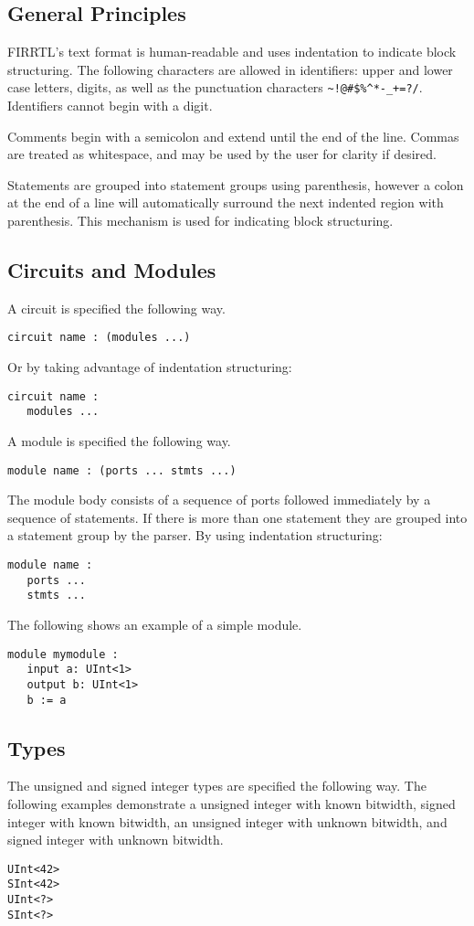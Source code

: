 \documentclass[12pt]{article}
\begin{document}
\subsection*{General Principles}
FIRRTL's text format is human-readable and uses indentation to indicate block structuring.
The following characters are allowed in identifiers: upper and lower case letters, digits, as well as the punctuation characters \verb|~!@#$%^*-_+=?/|.
Identifiers cannot begin with a digit. 

Comments begin with a semicolon and extend until the end of the line.
Commas are treated as whitespace, and may be used by the user for clarity if desired. 

Statements are grouped into statement groups using parenthesis, however a colon at the end of a line will automatically surround the next indented region with parenthesis.
This mechanism is used for indicating block structuring. 

\subsection*{Circuits and Modules}
A circuit is specified the following way.
\begin{verbatim}
circuit name : (modules ...)
\end{verbatim}
Or by taking advantage of indentation structuring:
\begin{verbatim}
circuit name :
   modules ...
\end{verbatim}

A module is specified the following way.
\begin{verbatim}
module name : (ports ... stmts ...)
\end{verbatim}
The module body consists of a sequence of ports followed immediately by a sequence of statements.
If there is more than one statement they are grouped into a statement group by the parser. 
By using indentation structuring:
\begin{verbatim}
module name :
   ports ...
   stmts ...
\end{verbatim}

The following shows an example of a simple module.
\begin{verbatim}
module mymodule :
   input a: UInt<1>
   output b: UInt<1>
   b := a
\end{verbatim}

\subsection*{Types}
The unsigned and signed integer types are specified the following way.
The following examples demonstrate a unsigned integer with known bitwidth, signed integer with known bitwidth, an unsigned integer with unknown bitwidth, and signed integer with unknown bitwidth.
\begin{verbatim}
UInt<42>
SInt<42>
UInt<?>
SInt<?>
\end{verbatim}
\end{document}
